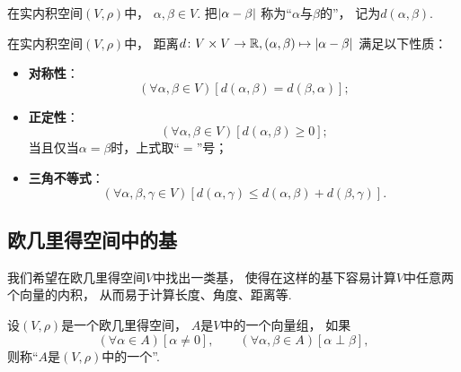 \begin{definition}
在实内积空间\((V,\rho)\)中，
\(\alpha,\beta \in V\).
把\(\abs{\alpha-\beta}\)
称为“\(\alpha\)与\(\beta\)的”，
记为\(d(\alpha,\beta)\).
\end{definition}

\begin{property}
在实内积空间\((V,\rho)\)中，
距离\(d\colon V \times V \to \mathbb{R},
(\alpha,\beta) \mapsto \abs{\alpha-\beta}\)
满足以下性质：\begin{itemize}
	\item {\rm\bf 对称性}：\begin{equation*}
		(\forall \alpha,\beta \in V)
		[
			d(\alpha,\beta) = d(\beta,\alpha)
		];
	\end{equation*}

	\item {\rm\bf 正定性}：\begin{equation*}
		(\forall \alpha,\beta \in V)
		[
			d(\alpha,\beta) \geq 0
		];
	\end{equation*}
	当且仅当\(\alpha = \beta\)时，上式取“\(=\)”号；

	\item {\rm\bf 三角不等式}：\begin{equation*}
		(\forall \alpha,\beta,\gamma \in V)
		[
			d(\alpha,\gamma) \leq d(\alpha,\beta) + d(\beta,\gamma)
		].
	\end{equation*}
\end{itemize}
\end{property}

\subsection{欧几里得空间中的基}
我们希望在欧几里得空间\(V\)中找出一类基，
使得在这样的基下容易计算\(V\)中任意两个向量的内积，
从而易于计算长度、角度、距离等.

\begin{definition}
设\((V,\rho)\)是一个欧几里得空间，
\(A\)是\(V\)中的一个向量组，
如果\begin{equation*}
	(\forall \alpha \in A)
	[\alpha\neq0],
	\qquad
	(\forall \alpha,\beta \in A)
	[\alpha \perp \beta],
\end{equation*}
则称“\(A\)是\((V,\rho)\)中的一个”.
\end{definition}

